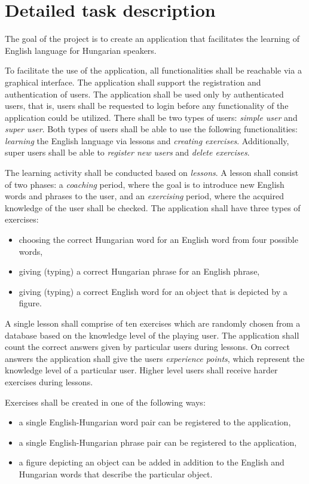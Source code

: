 \documentclass[a4paper]{article}
\begin{document}
	\section{Detailed task description}
	The goal of the project is to create an application that facilitates the learning of English language for Hungarian speakers.
	
	To facilitate the use of the application, all functionalities shall be reachable via a graphical interface. The application shall support the registration and authentication of users. The application shall be used only by authenticated users, that is,  users shall be requested to login before any functionality of the application could be utilized. There shall be two types of users: \textsl{simple user} and \textsl{super user}. Both types of users shall be able to use the following functionalities: \emph{learning} the English language via lessons and \emph{creating exercises}. Additionally, super users shall be able to \emph{register new users} and \emph{delete exercises}.
	
	The learning activity shall be conducted based on \emph{lessons}. A lesson shall consist of two phases: a \emph{coaching} period, where the goal is to introduce new English words and phrases to the user, and an \emph{exercising} period, where the acquired knowledge of the user shall be checked. The application shall have three types of exercises:
	\begin{itemize}
		\item choosing the correct Hungarian word for an English word from four possible words,
		\item giving (typing) a correct Hungarian phrase for an English phrase,
		\item giving (typing) a correct English word for an object that is depicted by a figure.
	\end{itemize}
	A single lesson shall comprise of ten exercises which are randomly chosen from a database based on the knowledge level of the playing user. The application shall count the correct answers given by particular users during lessons. On correct answers the application shall give the users \emph{experience points}, which represent the knowledge level of a particular user. Higher level users shall receive harder exercises during lessons. 

	Exercises shall be created in one of the following ways:
	\begin{itemize}
		\item a single English-Hungarian word pair can be registered to the application,
		\item a single English-Hungarian phrase pair can be registered to the application,
		\item a figure depicting an object can be added in addition to the English and Hungarian words that describe the particular object.
	\end{itemize}
	
\end{document}
